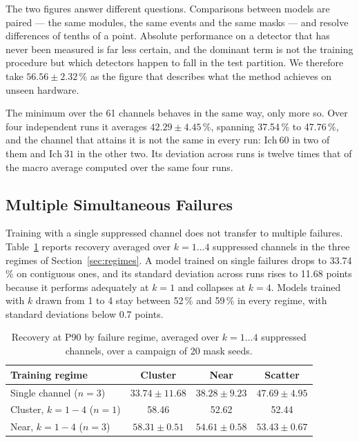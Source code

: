 \documentclass[10pt,conference]{IEEEtran}
\begin{document}
The two figures answer different questions. Comparisons between models are
paired --- the same modules, the same events and the same masks --- and resolve
differences of tenths of a point. Absolute performance on a detector
that has never been measured is far less certain, and the dominant term is not
the training procedure but which detectors happen to fall in the test
partition. We therefore take $56.56 \pm 2.32$\,\% as the figure that describes %
what the method achieves on unseen hardware.

The minimum over the 61 channels behaves in the same way, only more so. Over
four independent runs it averages $42.29 \pm 4.45$\,\%, spanning 37.54\,\% to
47.76\,\%, and the channel that attains it is not the same in every run:
$\mathrm{Ich}\ 60$ in two of them and $\mathrm{Ich}\ 31$ in the other two. Its
deviation across runs is twelve times that of the macro average computed over
the same four runs.

\subsection{Multiple Simultaneous Failures}
\label{sec:res-multidead}

Training with a single suppressed channel does not transfer to multiple
failures. Table~\ref{tab:multidead} reports recovery averaged over $k=1\dots4$
suppressed channels in the three regimes of
Section~\ref{sec:regimes}. A model trained on single failures drops to
33.74\,\% on contiguous ones, and its standard deviation across runs rises to
11.68 points because it performs adequately at $k=1$ and collapses at $k=4$.
Models trained with $k$ drawn from 1 to 4 stay between 52\,\% and 59\,\% in
every regime, with standard deviations below 0.7 points.

\begin{table}[t]
\centering
\caption{Recovery at P90 by failure regime, averaged over
$k=1\dots4$ suppressed channels, over a campaign of 20 mask seeds.}
\label{tab:multidead}
\begin{tabular}{@{}lccc@{}}
\toprule
\textbf{Training regime} & \textbf{Cluster} & \textbf{Near} & \textbf{Scatter} \\
\midrule
Single channel ($n{=}3$)
  & $33.74 \pm 11.68$ & $38.28 \pm 9.23$ & $47.69 \pm 4.95$ \\
Cluster, $k{=}1\!-\!4$ ($n{=}1$)
  & 58.46 & 52.62 & 52.44 \\
Near, $k{=}1\!-\!4$ ($n{=}3$)
  & $58.31 \pm 0.51$ & $54.61 \pm 0.58$ & $53.43 \pm 0.67$ \\
\bottomrule
\end{tabular}
\end{table}
\end{document}
